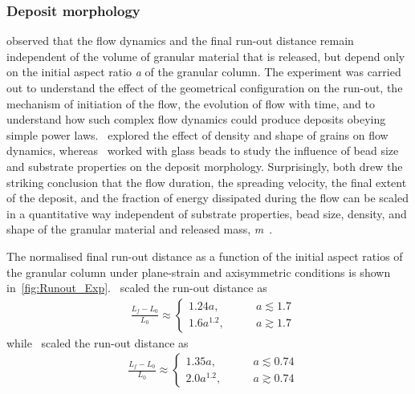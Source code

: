 \subsubsection{Deposit morphology}


\citet{Lajeunesse2005} observed that the flow dynamics and the final run-out 
distance remain independent of the volume of granular material that is 
released, but depend only on the initial aspect ratio \textit{a} of the 
granular column. The experiment was carried out to understand the effect of the 
geometrical configuration on the run-out, the mechanism of initiation of the 
flow, the evolution of flow with time, and to understand how such complex flow 
dynamics could produce deposits obeying simple power laws.~\citet{Lube2005} 
explored the effect of density and shape of grains on flow dynamics, 
whereas~\citet{Lajeunesse2004} worked with glass beads to study the influence 
of bead size and substrate properties on the deposit morphology. Surprisingly, 
both drew the striking conclusion that the flow duration, the spreading 
velocity, the final extent of the deposit, and the fraction of energy 
dissipated during the flow can be scaled in a quantitative way independent of 
substrate properties, bead size, density, and shape of the granular material 
and released mass, \textit{m}~\citep{Lajeunesse2005}.

The normalised final run-out distance as a function of the initial aspect 
ratios of the granular column under plane-strain and axisymmetric conditions 
is shown in~\cref{fig:Runout_Exp}.~\citet{Lube2005} scaled the run-out distance 
as
\begin{align}
& \frac{\textit{L}_{\textit{f}}- 
\textit{L}_{\textit{0}}}{\textit{L}_{\textit{0}}} \approx
\begin{cases} 
1.24\textit{a}, \qquad &\textit{a} \lesssim 1.7 \\
1.6\textit{a}^{1.2}, \qquad &\textit{a} \gtrsim 1.7
\end{cases}
\end{align}
while~\citet{Lajeunesse2005} scaled the run-out distance as
\begin{align}
& \frac{\textit{L}_{\textit{f}}- 
\textit{L}_{\textit{0}}}{\textit{L}_{\textit{0}}} \approx
\begin{cases} 
1.35\textit{a}, \qquad &\textit{a} \lesssim 0.74 \\
2.0\textit{a}^{1.2}, \qquad &\textit{a} \gtrsim 0.74
\end{cases}
\end{align} 

